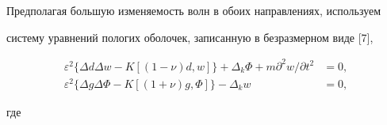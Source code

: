  


Предполагая большую изменяемость волн в обоих направлениях, используем 


систему уравнений пологих оболочек, записанную в безразмерном виде [7],


\begin{equation} 


\begin{split} 


\varepsilon^2\{\Delta d\Delta w-K[(1-\nu)d,w]\}+ 


\Delta_k\Phi+m\partial^2w/\partial t^2&=0,\\ 


\varepsilon^2\{\Delta g\Delta\Phi-K[(1+\nu)g,\Phi]\}- 


\Delta_kw&=0, 


\end{split} 


\end{equation} 


где 


